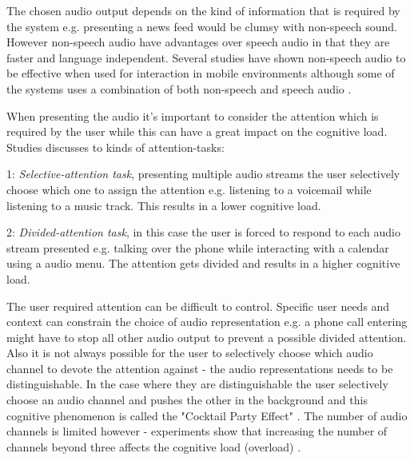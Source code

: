The chosen audio output depends on the kind of information that is required by the system e.g. presenting a news feed would be clumsy with non-speech sound. However non-speech audio have advantages over speech audio in that they are faster and language independent. Several studies have shown non-speech audio to be effective when used for interaction in mobile environments although some of the systems uses a combination of both non-speech and speech audio \cite{pirhonen_gestural_2002, sawhney_nomadic_2000, brewster_using_2000}.

When presenting the audio it's important to consider the attention which is required by the user while this can have a great impact on the cognitive load. Studies \cite{vazquez-alvarez_eyes-free_2011, shinn-cunningham_selective_2004} discusses to kinds of attention-tasks:

\begin{description}
\item{1: \textit{Selective-attention task}}, presenting multiple audio streams the user selectively choose which one to assign the attention e.g. listening to a voicemail while listening to a music track. This results in a lower cognitive load.

\item{2: \textit{Divided-attention task}}, in this case the user is forced to respond to each audio stream presented e.g. talking over the phone while interacting with a calendar using a audio menu. The attention gets divided and results in a higher cognitive load.
\end{description}

The user required attention can be difficult to control. Specific user needs and context can constrain the choice of audio representation e.g. a phone call entering might have to stop all other audio output to prevent a possible divided attention. Also it is not always possible for the user to selectively choose which audio channel to devote the attention against - the audio representations needs to be distinguishable. In the case where they are distinguishable the user selectively choose an audio channel and pushes the other in the background and this cognitive phenomenon is called the "Cocktail Party Effect" \cite{bronkhorst_cocktail_2000}. The number of audio channels is limited however - experiments show that increasing the number of channels beyond three affects the cognitive load (overload) \cite{bronkhorst_cocktail_2000}.

